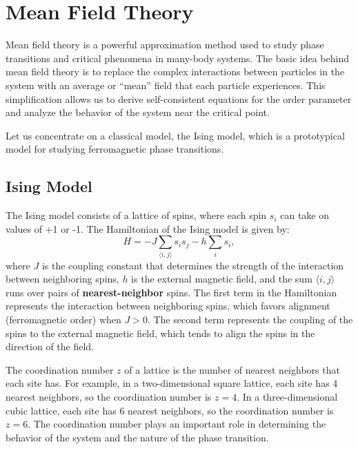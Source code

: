 \section{Mean Field Theory}

Mean field theory is a powerful approximation method used to study phase transitions and critical phenomena in many-body systems. The basic idea behind mean field theory is to replace the complex interactions between particles in the system with an average or ``mean'' field that each particle experiences. This simplification allows us to derive self-consistent equations for the order parameter and analyze the behavior of the system near the critical point.

Let us concentrate on a classical model, the Ising model, which is a prototypical model for studying ferromagnetic phase transitions.

\subsection{Ising Model} 

The Ising model consists of a lattice of spins, where each spin \(s_i\) can take on values of +1 or -1. The Hamiltonian of the Ising model is given by:
\[
    H = - J \sum_{\langle i,j \rangle} s_i s_j - h \sum_i s_i,
\]
where \(J\) is the coupling constant that determines the strength of the interaction between neighboring spins, \(h\) is the external magnetic field, and the sum \(\langle i,j \rangle\) runs over pairs of \textbf{nearest-neighbor} spins. The first term in the Hamiltonian represents the interaction between neighboring spins, which favors alignment (ferromagnetic order) when \(J > 0\). The second term represents the coupling of the spins to the external magnetic field, which tends to align the spins in the direction of the field.

\begin{definition}
    The coordination number \(z\) of a lattice is the number of nearest neighbors that each site has. For example, in a two-dimensional square lattice, each site has 4 nearest neighbors, so the coordination number is \(z = 4\). In a three-dimensional cubic lattice, each site has 6 nearest neighbors, so the coordination number is \(z = 6\). The coordination number plays an important role in determining the behavior of the system and the nature of the phase transition.
\end{definition}

